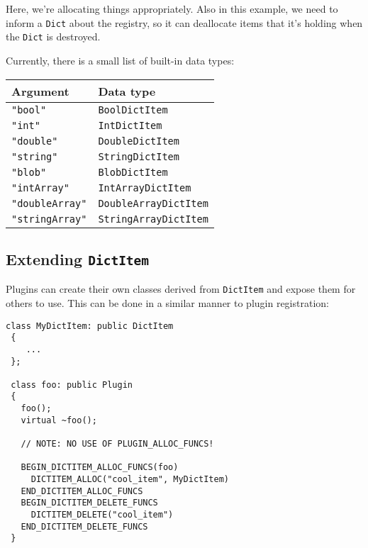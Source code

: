 Here, we're allocating things appropriately. Also in this example, we
need to inform a {\tt Dict} about the registry, so it can deallocate items
that it's holding when the {\tt Dict} is destroyed.

Currently, there is a small list of built-in data types:

\begin{center}
\begin{tabular}{l|l}
Argument            & Data type \\ \hline
{\tt "bool"}        & {\tt BoolDictItem}   \\ \hline
{\tt "int"}         &  {\tt IntDictItem}     \\ \hline
{\tt "double"}      &  {\tt DoubleDictItem}     \\ \hline
{\tt "string"}      &  {\tt StringDictItem}     \\ \hline
{\tt "blob"}        &  {\tt BlobDictItem}    \\ \hline
{\tt "intArray"}    &  {\tt IntArrayDictItem}     \\ \hline
{\tt "doubleArray"} &  {\tt DoubleArrayDictItem}     \\ \hline
{\tt "stringArray"} &  {\tt StringArrayDictItem}     \\ \hline
\end{tabular}
\end{center}


\subsection{Extending {\tt DictItem}}

Plugins can create their own classes derived from {\tt DictItem} and expose
them for others to use. This can be done in a similar manner to plugin 
registration:

\begin{lstlisting}[frame=single]
 class MyDictItem: public DictItem
 {
    ...
 };

 class foo: public Plugin
 {
   foo();
   virtual ~foo();

   // NOTE: NO USE OF PLUGIN_ALLOC_FUNCS!

   BEGIN_DICTITEM_ALLOC_FUNCS(foo)
     DICTITEM_ALLOC("cool_item", MyDictItem)
   END_DICTITEM_ALLOC_FUNCS
   BEGIN_DICTITEM_DELETE_FUNCS
     DICTITEM_DELETE("cool_item")
   END_DICTITEM_DELETE_FUNCS
 }

\end{lstlisting}

